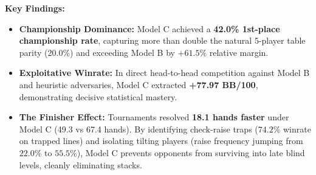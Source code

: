\begin{table}[h]
\centering
\caption{Comprehensive CardShark-RL Performance Benchmark}
\label{tab:model_comparison}
\end{table}

\textbf{Key Findings:}
\begin{itemize}
    \item \textbf{Championship Dominance:} Model C achieved a \textbf{42.0\% 1st-place championship rate}, capturing more than double the natural 5-player table parity (20.0\%) and exceeding Model B by $+61.5\%$ relative margin.
    \item \textbf{Exploitative Winrate:} In direct head-to-head competition against Model B and heuristic adversaries, Model C extracted \textbf{+77.97 BB/100}, demonstrating decisive statistical mastery.
    \item \textbf{The Finisher Effect:} Tournaments resolved \textbf{18.1 hands faster} under Model C (49.3 vs 67.4 hands). By identifying check-raise traps ($74.2\%$ winrate on trapped lines) and isolating tilting players (raise frequency jumping from $22.0\%$ to $55.5\%$), Model C prevents opponents from surviving into late blind levels, cleanly eliminating stacks.
\end{itemize}
